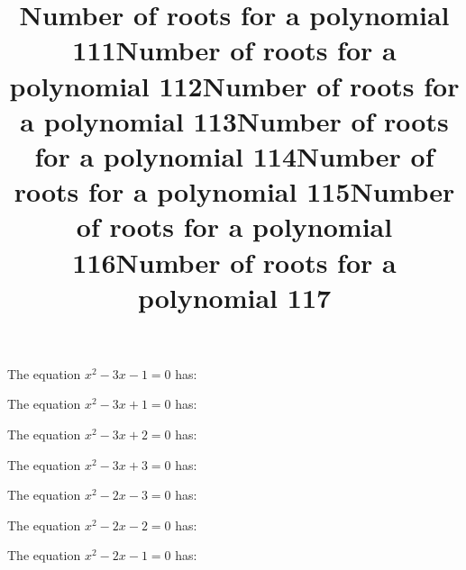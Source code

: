\documentclass{article}
\begin{document}
\begin{category}
\begin{question}[multichoice]
\end{question}
\begin{question}[multichoice]
\title{Number of roots for a polynomial 111}
The equation $x^{2} - 3 x - 1=0$ has:


\end{question}
\begin{question}[multichoice]
\title{Number of roots for a polynomial 112}
The equation $x^{2} - 3 x + 1=0$ has:


\end{question}
\begin{question}[multichoice]
\title{Number of roots for a polynomial 113}
The equation $x^{2} - 3 x + 2=0$ has:


\end{question}
\begin{question}[multichoice]
\title{Number of roots for a polynomial 114}
The equation $x^{2} - 3 x + 3=0$ has:


\end{question}
\begin{question}[multichoice]
\title{Number of roots for a polynomial 115}
The equation $x^{2} - 2 x - 3=0$ has:


\end{question}
\begin{question}[multichoice]
\title{Number of roots for a polynomial 116}
The equation $x^{2} - 2 x - 2=0$ has:


\end{question}
\begin{question}[multichoice]
\title{Number of roots for a polynomial 117}
The equation $x^{2} - 2 x - 1=0$ has:


\end{question}
\end{category}
\end{document}
